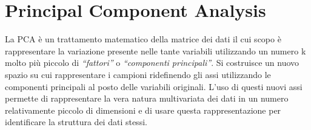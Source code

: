 \documentclass[12pt]{article}
\begin{document}
\section{Principal Component Analysis}

	La \ac{PCA} è un trattamento matematico della matrice dei dati il cui scopo è rappresentare la variazione presente nelle tante variabili utilizzando un	numero k molto più piccolo di \emph{“fattori”} o \emph{“componenti principali”}. Si costruisce un nuovo spazio su cui rappresentare i campioni	ridefinendo gli assi utilizzando le componenti principali al posto delle variabili originali. L’uso di questi nuovi assi permette di rappresentare la vera natura multivariata dei dati in un numero relativamente piccolo di dimensioni e di usare questa rappresentazione per identificare la struttura dei dati stessi.  
	
\end{document}
